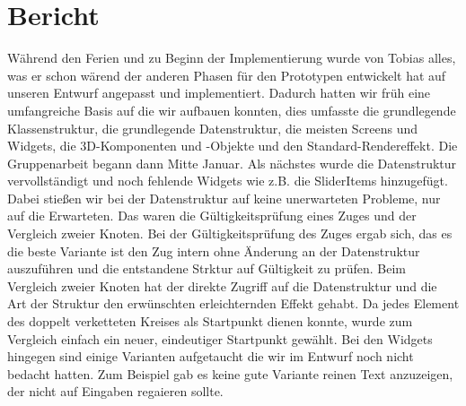 \chapter{Bericht}
Während den Ferien und zu Beginn der Implementierung wurde von Tobias alles, was er schon wärend der anderen Phasen für den Prototypen entwickelt hat auf unseren Entwurf angepasst und implementiert.
Dadurch hatten wir früh eine umfangreiche Basis auf die wir aufbauen konnten, dies umfasste die grundlegende Klassenstruktur, die grundlegende Datenstruktur, die meisten Screens und Widgets, die 3D-Komponenten und -Objekte und den Standard-Rendereffekt.
Die Gruppenarbeit begann dann Mitte Januar.
Als nächstes wurde die Datenstruktur vervollständigt und noch fehlende Widgets wie z.B. die SliderItems hinzugefügt.
Dabei stießen wir bei der Datenstruktur auf keine unerwarteten Probleme, nur auf die Erwarteten.
Das waren die Gültigkeitsprüfung eines Zuges und der Vergleich zweier Knoten.
Bei der Gültigkeitsprüfung des Zuges ergab sich, das es die beste Variante ist den Zug intern ohne Änderung an der Datenstruktur auszuführen und die entstandene Strktur auf Gültigkeit zu prüfen.
Beim Vergleich zweier Knoten hat der direkte Zugriff auf die Datenstruktur und die Art der Struktur den erwünschten erleichternden Effekt gehabt. Da jedes Element des doppelt verketteten Kreises als Startpunkt dienen konnte, wurde zum Vergleich einfach ein neuer, eindeutiger Startpunkt gewählt.
Bei den Widgets hingegen sind einige Varianten aufgetaucht die wir im Entwurf noch nicht bedacht hatten. Zum Beispiel gab es keine gute Variante reinen Text anzuzeigen, der nicht auf Eingaben regaieren sollte.
